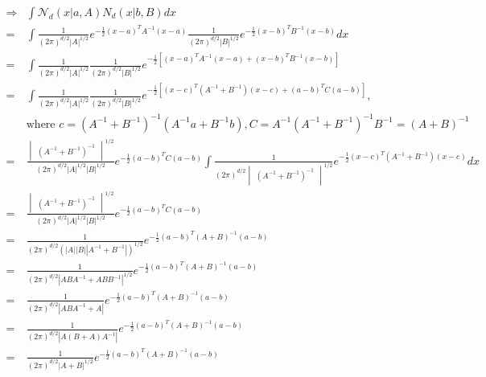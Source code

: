 \begin{itemize}
\begin{itemize}
		\begin{align*} \displaystyle \Rightarrow & \int \mathcal N_d(x|a,A) N_d(x|b,B)dx \\ = & \int \frac 1 {(2\pi)^{d/2} |A|^{1/2}} e^{-\frac 1 2 (x-a)^TA^{-1}(x-a)} \frac 1 {(2\pi)^{d/2}|B|^{1/2}} e^{-\frac 1 2 (x-b)^TB^{-1}(x-b)} dx \\ = & \int \frac 1 {(2\pi)^{d/2} |A|^{1/2}} \frac 1 {(2\pi)^{d/2}|B|^{1/2}} e^{-\frac 12 [(x-a)^TA^{-1}(x-a)+(x-b)^TB^{-1}(x-b)]} \\ = & \int \frac 1 {(2\pi)^{d/2} |A|^{1/2}} \frac 1 {(2\pi)^{d/2}|B|^{1/2}}  e^{-\frac 12 [(x-c)^T (A^{-1}+B^{-1}) (x-c)+(a-b)^TC(a-b)]},\\ & \text{where } c=(A^{-1}+B^{-1})^{-1}(A^{-1}a+B^{-1}b), C=A^{-1}(A^{-1}+B^{-1})^{-1}B^{-1} = (A+B)^{-1} \\ = & \frac {\begin{vmatrix}(A^{-1}+B^{-1})^{-1}\end{vmatrix}^{1/2}} {(2\pi)^{d/2}|A|^{1/2}|B|^{1/2}} e^{-\frac 12 (a-b)^TC(a-b)} \int \frac 1 {(2\pi)^{d/2}\begin{vmatrix}(A^{-1}+B^{-1})^{-1}\end{vmatrix}^{1/2}} e^{-\frac 12 (x-c)^T(A^{-1}+B^{-1}) (x-c)} dx \\ =& \frac {\begin{vmatrix}(A^{-1}+B^{-1})^{-1}\end{vmatrix}^{1/2}} {(2\pi)^{d/2}|A|^{1/2}|B|^{1/2}} e^{-\frac 12 (a-b)^TC(a-b)} \\ =& \frac 1 {(2\pi)^{d/2} (|A||B||A^{-1}+B^{-1}|)^{1/2}} e^{-\frac 12 (a-b)^T (A+B)^{-1} (a-b)} \\=& \frac 1 {(2\pi)^{d/2} |ABA^{-1}+ABB^{-1}|^{1/2}} e^{-\frac 12 (a-b)^T (A+B)^{-1} (a-b)} \\=& \frac 1 {(2\pi)^{d/2} |ABA^{-1}+A| } e^{-\frac 12 (a-b)^T (A+B)^{-1} (a-b)} \\=& \frac 1 {(2\pi)^{d/2} |A(B+A)A^{-1}| } e^{-\frac 12 (a-b)^T (A+B)^{-1} (a-b)} \\=& \frac 1 {(2\pi)^{d/2} |A+B|^{1/2} } e^{-\frac 12 (a-b)^T (A+B)^{-1} (a-b)} \end{align*}
			

\end{itemize}
\end{itemize}
